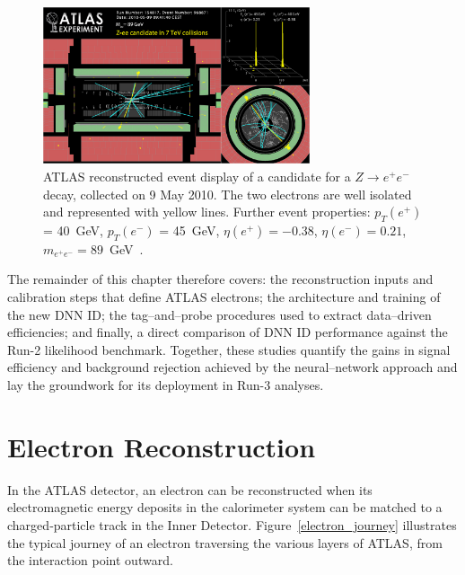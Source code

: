 \begin{figure}[htbp]
    \centering
    \includegraphics[width=0.7\textwidth]{images/Zee.png}
    \caption{ATLAS reconstructed event display of a candidate for a $Z\to e^+e^-$ decay, collected on 9 May 2010. The two electrons are well isolated and represented with yellow lines. Further event properties: $p_{T}(e^{+})$ = 40~GeV, $p_{T}(e^{-})$ = 45~GeV, $\eta(e^{+}) = -0.38$, $\eta(e^{-}) = 0.21$, $m_{e^{+}e^{-}}=89$~GeV~\cite{atlas:eventdisplay}. }
    \label{fig:zee}
\end{figure}

The remainder of this chapter therefore covers: the reconstruction inputs and calibration steps that define ATLAS electrons; the architecture and training of the new DNN ID; the tag–and–probe procedures used to extract data–driven efficiencies; and finally, a direct comparison of DNN ID performance against the Run-2 likelihood benchmark.  Together, these studies quantify the gains in signal efficiency and background rejection achieved by the neural–network approach and lay the groundwork for its deployment in Run-3 analyses.  

\section{Electron Reconstruction}

In the ATLAS detector, an electron can be reconstructed when its electromagnetic energy deposits in the calorimeter system can be matched to a charged‐particle track in the Inner Detector. Figure~\ref{electron_journey} illustrates the typical journey of an electron traversing the various layers of ATLAS, from the interaction point outward.

